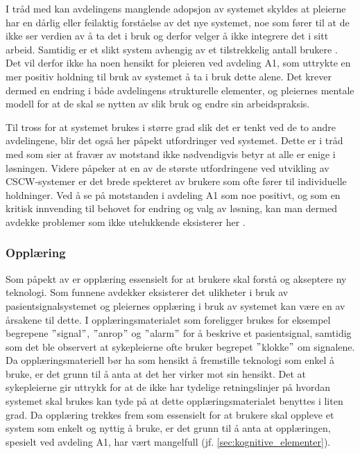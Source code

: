 \noindent
I tråd med \citet{Orlikowski92} kan avdelingens manglende adopsjon av systemet skyldes at pleierne har en dårlig eller feilaktig forståelse av det nye systemet, noe som fører til at de ikke ser verdien av å ta det i bruk og derfor velger å ikke integrere det i sitt arbeid. Samtidig er et slikt system avhengig av et tilstrekkelig antall brukere \citep{Ackermann00}. Det vil derfor ikke ha noen hensikt for pleieren ved avdeling A1, som uttrykte en mer positiv holdning til bruk av systemet å ta i bruk dette alene. Det krever dermed en endring i både avdelingens strukturelle elementer, og pleiernes mentale modell for at de skal se nytten av slik bruk og endre sin arbeidspraksis.

\noindent
Til tross for at systemet brukes i større grad slik det er tenkt ved de to andre avdelingene, blir det også her påpekt utfordringer ved systemet. Dette er i tråd med \citet{Jacobsen12} som sier at fravær av motstand ikke nødvendigvis betyr at alle er enige i løsningen. Videre påpeker \citet{Berg99} at en av de største utfordringene ved utvikling av CSCW-systemer er det brede spekteret av brukere som ofte fører til individuelle holdninger. Ved å se på motstanden i avdeling A1 som noe positivt, og som en kritisk innvending til behovet for endring og valg av løsning, kan man dermed avdekke problemer som ikke utelukkende eksisterer her \citep{Jacobsen}. 

\subsubsection{Opplæring}	 
Som påpekt av \citet{Venkatesh99} er opplæring essensielt for at brukere skal forstå og akseptere ny teknologi.	Som funnene avdekker eksisterer det ulikheter i bruk av pasientsignalsystemet og pleiernes opplæring i bruk av systemet kan være en av årsakene til dette. I opplæringsmaterialet som foreligger brukes for eksempel begrepene $"$signal$"$, $"$anrop$"$ og $"$alarm$"$ for å beskrive et pasientsignal, samtidig som det ble observert at sykepleierne ofte bruker begrepet $"$klokke$"$ om signalene. Da opplæringsmateriell bør ha som hensikt å fremstille teknologi som enkel å bruke, er det grunn til å anta at det her virker mot sin hensikt. Det at sykepleierne gir uttrykk for at de ikke har tydelige retningslinjer på hvordan systemet skal brukes kan tyde på at dette opplæringsmaterialet benyttes i liten grad. Da opplæring trekkes frem som essensielt for at brukere skal oppleve et system som enkelt og nyttig å bruke, er det grunn til å anta at opplæringen, spesielt ved avdeling A1, har vært mangelfull (jf. \ref{sec:kognitive_elementer}). 

